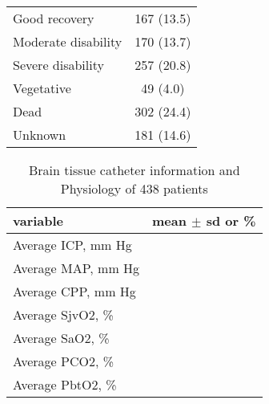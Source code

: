 \documentclass{article}
\begin{document}
\begin{table}[H]
\begin{center}
\begin{tabular}{lc}
\hspace{1 em} Good recovery & 167 (13.5)\\
\hspace{1 em} Moderate disability & 170 (13.7)\\
\hspace{1 em} Severe disability & 257 (20.8)\\
\hspace{1 em} Vegetative & 49 (4.0)\\
\hspace{1 em} Dead & 302 (24.4)\\
\hspace{1 em} Unknown & 181 (14.6)\\
\hline
\end{tabular}
\end{center}
\label{demog}
\end{table}%






\newpage
\begin{table}[H]
\caption{Brain tissue catheter information and Physiology of 438 patients}
\begin{center}
\begin{tabular}{lc}
\hline
variable & mean $\pm$ sd or \%\\
\hline
Average ICP, mm Hg & \\
Average MAP, mm Hg & \\
Average CPP, mm Hg & \\
Average SjvO2, \% & \\
Average SaO2, \% & \\
Average PCO2, \% & \\
Average PbtO2, \% & \\
\hline
\end{tabular}
\end{center}
\label{demog}
\end{table}%
\end{document}
